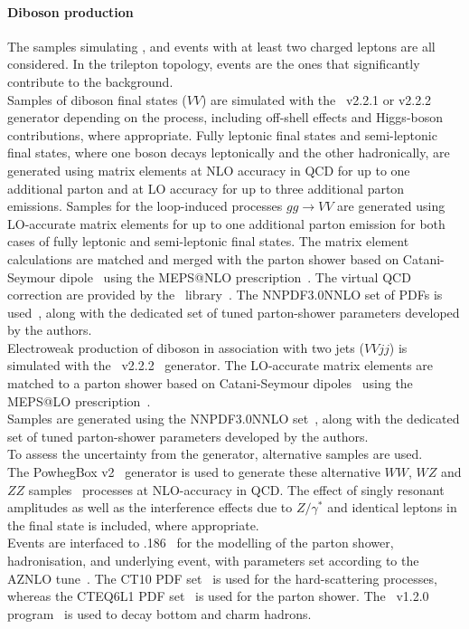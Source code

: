 \paragraph{Diboson production} 
The samples simulating \PW{}\PW, \PW{}\PZ and \PZ{}\PZ events with at least two charged leptons are all considered.
In the trilepton topology, \PW{}\PZ events are the ones that significantly contribute to the background.\\
Samples of diboson final states ($VV$) are simulated with the
\sherpa~v2.2.1 or v2.2.2~\cite{Bothmann:2019yzt} generator depending on the process,
including off-shell effects and Higgs-boson contributions, where appropriate.
Fully leptonic final states and semi-leptonic final states, where one boson
decays leptonically and the other hadronically, are generated using
matrix elements at NLO accuracy in QCD for up to one additional parton
and at LO accuracy for up to three additional parton
emissions. Samples for the loop-induced processes $gg \to VV$ are
generated using LO-accurate matrix elements for up to one
additional parton emission for both cases of fully leptonic and
semi-leptonic final states. The matrix element calculations are matched
and merged with the \sherpa parton shower based on Catani-Seymour
dipole~\cite{Gleisberg:2008fv,Schumann:2007mg} using the MEPS@NLO
prescription~\cite{Hoeche:2011fd,Hoeche:2012yf,Catani:2001cc,Hoeche:2009rj}.
The virtual QCD correction are provided by the
\openloops\ library~\cite{Cascioli:2011va,Denner:2016kdg}. The 
\textsc{NNPDF3.0NNLO} set of PDFs is used~\cite{Ball:2014uwa}, along with the
dedicated set of tuned parton-shower parameters developed by the
\sherpa authors.\\
Electroweak production of diboson in association with two jets
($VVjj$) is simulated with the \sherpa~v2.2.2~\cite{Bothmann:2019yzt}
generator. The LO-accurate matrix elements are matched to a parton
shower based on Catani-Seymour dipoles~\cite{Gleisberg:2008fv,Schumann:2007mg} using the MEPS@LO
prescription~\cite{Hoeche:2011fd,Hoeche:2012yf,Catani:2001cc,Hoeche:2009rj}.\\
Samples are generated using the \textsc{NNPDF3.0NNLO} set~\cite{Ball:2014uwa},
along with the dedicated set of tuned parton-shower parameters
developed by the \sherpa authors.\\
To assess the uncertainty from the generator, alternative samples are used. \\
The PowhegBox v2~\cite{Nason:2004rx,Frixione:2007vw,Alioli:2010xd} generator
is used to generate these alternative $WW$, $WZ$ and $ZZ$ samples~\cite{Nason:2013ydw}
processes at NLO-accuracy in QCD. The effect of singly resonant
amplitudes as well as the interference effects due to $Z/\gamma^*$ and
identical leptons in the final state is included, where appropriate. \\
Events are interfaced to \pythia{}.186~\cite{Sjostrand:2007gs}
for the modelling of the parton shower, hadronisation, and underlying
event, with parameters set according to the AZNLO
tune~\cite{STDM-2012-23}. The CT10 PDF set~\cite{Lai:2010vv} is used
for the hard-scattering processes, whereas the CTEQ6L1 PDF
set~\cite{Pumplin:2002vw} is used for the parton shower. The \evtgen~v1.2.0
program~\cite{EvtGen} is used to decay bottom and charm hadrons.

